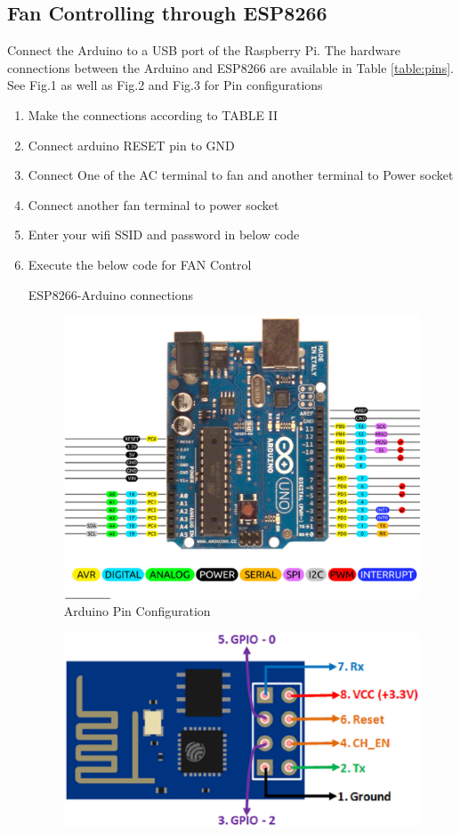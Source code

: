\documentclass[journal,12pt,twocolumn]{IEEEtran}
\begin{document}
\subsection{Fan Controlling through ESP8266}
Connect the Arduino to a USB port of the Raspberry Pi.  The hardware connections between the Arduino and ESP8266 are available in Table \ref{table:pins}. See Fig.1 as well as Fig.2 and Fig.3 for Pin configurations
\begin{enumerate}
\item Make the connections according to TABLE II
\item Connect arduino RESET pin to GND
\item Connect One of the AC terminal to fan and another terminal to Power socket
\item Connect another fan terminal to power socket
\item Enter your wifi SSID and password in below code
\item Execute the below code for FAN Control
\begin{table}[!h]
\centering

\caption{ESP8266-Arduino connections}
\label{table:pins}
\end{table}
\begin{figure}[!h]
\centering
\includegraphics[width=\columnwidth]{./figs/ar.eps}
\caption{Arduino Pin Configuration}
\label{fig:arduino}
\end{figure}
%
\begin{figure}[!h]
\centering
\includegraphics[width=\columnwidth]{./figs/esp.eps}

\end{figure}
\end{enumerate}
\end{document}
